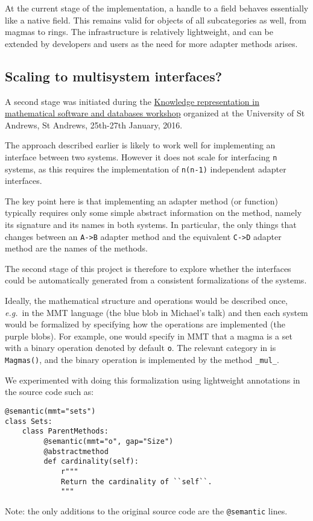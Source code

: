 At the current stage of the implementation, a handle to a \GAP field
behaves essentially like a native \Sage field. This remains valid for
objects of all subcategories as well, from magmas to rings. The
infrastructure is relatively lightweight, and can be extended by
developers and users as the need for more adapter methods arises.

\subsection{Scaling to multisystem interfaces?}\label{scaling-to-multisystem-interfaces}

A second stage was initiated during the
\href{http://opendreamkit.org/2015/12/08/WP6StAndrewsMeeting/}{Knowledge
representation in mathematical software and databases workshop}
organized at the University of St Andrews, St Andrews, 25th-27th
January, 2016.

The approach described earlier is likely to work well for implementing
an interface between two systems. However it does not scale for
interfacing \texttt{n} systems, as this requires the implementation of
\texttt{n(n-1)} independent adapter interfaces.

The key point here is that implementing an adapter method (or
function) typically requires only some simple abstract information on
the method, namely its signature and its names in both systems.  In
particular, the only things that changes between an \texttt{A->B}
adapter method and the equivalent \texttt{C->D} adapter method are the
names of the methods.

The second stage of this project is therefore to explore whether the
interfaces could be automatically generated from a consistent
formalizations of the systems.


Ideally, the mathematical structure and operations would be described
once, \emph{e.g.}\ in the MMT language (the blue blob in Michael's talk) and
then each system would be formalized by specifying how the operations
are implemented (the purple blobs). For example, one would specify in
MMT that a magma is a set with a binary operation denoted by default
\texttt{o}. The relevant category in \Sage is \texttt{Magmas()}, and
the binary operation is implemented by the method \texttt{\_mul\_}.

We experimented with doing this formalization using lightweight
annotations in the \Sage source code such as:
\begin{lstlisting}
@semantic(mmt="sets")
class Sets:
    class ParentMethods:
         @semantic(mmt="o", gap="Size")
         @abstractmethod
         def cardinality(self):
             r"""
             Return the cardinality of ``self``.
             """
\end{lstlisting}
Note: the only additions to the original source code are the \texttt{@semantic} lines.

